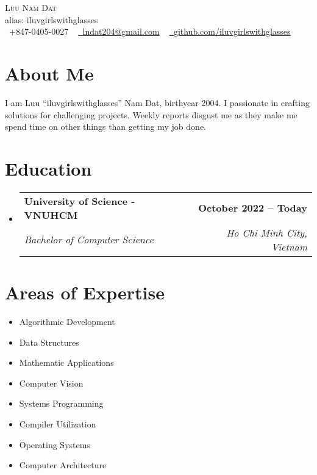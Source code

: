 \documentclass[letterpaper,11pt]{article}
\makeatletter
\newcommand{\resumeSubheading}[4]{
\vspace{-2pt}\item
\begin{tabular*}{1.0\textwidth}[t]{l@{\extracolsep{\fill}}r}
\textbf{#1} & \textbf{\small #2} \\
\textit{\small#3} & \textit{\small #4} \\
    \end{tabular*}\vspace{-7pt}
}
\newcommand{\resumeSubHeadingListStart}{\begin{itemize}[leftmargin=0.0in, label={}]}
\newcommand{\resumeSubHeadingListEnd}{\end{itemize}}
\makeatother
\begin{document}

\begin{center}
{\Huge \scshape Luu Nam Dat} \\ \vspace{1pt}
alias: iluvgirlswithglasses \\ \vspace{1pt}
\small \raisebox{-0.1\height}\faPhone\ +847-0405-0027 ~ \href{mailto:lndat204@gmail.com}{\raisebox{-0.2\height}\faEnvelope\  \underline{lndat204@gmail.com}} ~ 
\href{https://github.com/iluvgirlswithglasses}{\raisebox{-0.2\height}\faGithub\ \underline{github.com/iluvgirlswithglasses}}
\vspace{-8pt}
\end{center}


\section{About Me}
I am Luu ``iluvgirlswithglasses'' Nam Dat, birthyear 2004. I passionate in crafting solutions for challenging projects. Weekly reports disgust me as they make me spend time on other things than getting my job done.


\section{Education}
\resumeSubHeadingListStart
\resumeSubheading
{University of Science - VNUHCM}{October 2022 -- Today}
{Bachelor of Computer Science}{Ho Chi Minh City, Vietnam}
\resumeSubHeadingListEnd


\section{Areas of Expertise}
\begin{multicols}{4}
\begin{itemize}[itemsep=-5pt, parsep=3pt]
\item\small Algorithmic Development
\item Data Structures
\item Mathematic Applications
\item Computer Vision
\item Systems Programming
\item Compiler Utilization
\item Operating Systems
\item Computer Architecture
\end{itemize}
\end{multicols}
\vspace*{2.0\multicolsep}
\end{document}
